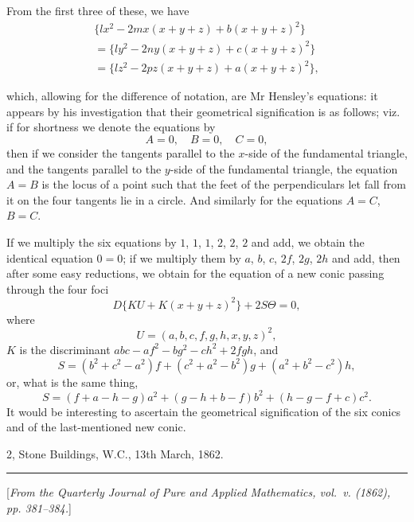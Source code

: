 \documentclass[11pt,a4paper]{book}
\providecommand{\between}{,}
\begin{document}
From the first three of these, we have
\begin{multline*}
\{lx^2 - 2mx(x+y+z) + b(x+y+z)^2\}\\
= \{ly^2 - 2ny(x+y+z) + c(x+y+z)^2\}\\
= \{lz^2 - 2pz(x+y+z) + a(x+y+z)^2\},
\end{multline*}

\newpage
\setcounter{page}{509}

which, allowing for the difference of notation, are Mr Hensley's equations: it appears by his investigation that their geometrical signification is as follows; viz. if for shortness we denote the equations by
\[
A = 0,\quad B = 0,\quad C = 0,
\]
then if we consider the tangents parallel to the $x$-side of the fundamental triangle, and the tangents parallel to the $y$-side of the fundamental triangle, the equation $A = B$ is the locus of a point such that the feet of the perpendiculars let fall from it on the four tangents lie in a circle. And similarly for the equations $A = C$, $B = C$.

If we multiply the six equations by $1$, $1$, $1$, $2$, $2$, $2$ and add, we obtain the identical equation $0 = 0$; if we multiply them by $a$, $b$, $c$, $2f$, $2g$, $2h$ and add, then after some easy reductions, we obtain for the equation of a new conic passing through the four foci
\[
D\{KU + K(x+y+z)^2\} + 2S\Theta = 0,
\]
where
\[
U = (a, b, c, f, g, h \between x, y, z)^2,
\]
$K$ is the discriminant $abc - af^2 - bg^2 - ch^2 + 2fgh$, and
\[
S = (b^2+c^2-a^2)f + (c^2+a^2-b^2)g + (a^2+b^2-c^2)h,
\]
or, what is the same thing,
\[
S = (f+a-h-g)a^2 + (g-h+b-f)b^2 + (h-g-f+c)c^2.
\]
It would be interesting to ascertain the geometrical signification of the six conics and of the last-mentioned new conic.

\begin{flushright}
2, Stone Buildings, W.C., 13th March, 1862.
\end{flushright}

\vspace{1.5em}
\hrule
\vspace{1.5em}


{\small
[\textit{From the Quarterly Journal of Pure and Applied Mathematics, vol.~v. (1862), pp. 381--384.}]
\par}
\vspace{0.5em}
\end{document}

